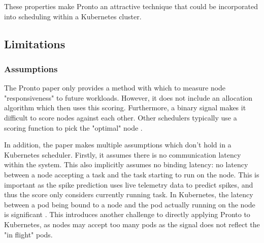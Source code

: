 These properties make Pronto an attractive technique that could be incorporated
into scheduling within a Kubernetes cluster.

\subsection{Limitations}

\subsubsection{Assumptions}
The Pronto paper only provides a method with which to measure node
"responsiveness" to future workloads. However, it does not include an allocation
algorithm which then uses this scoring. Furthermore, a binary signal makes it
difficult to score nodes against each other. Other schedulers typically use a
scoring function to pick the "optimal" node \cite{kube-scheduler}\cite{}.

In addition, the paper makes multiple assumptions which don't hold in a Kubernetes
scheduler. Firstly, it assumes there is no communication latency within the system.
This also implicitly assumes no binding latency: no latency between a node
accepting a task and the task starting to run on the node. This is important as
the spike prediction uses live telemetry data to predict spikes, and thus the
score only considers currently running task. In Kubernetes, the latency between
a pod being bound to a node and the pod actually running on the node is
significant \cite{tyczynski_kubernetes_2015}. This introduces another challenge to directly applying
Pronto to Kubernetes, as nodes may accept too many pods as the signal does not
reflect the "in flight" pods.

